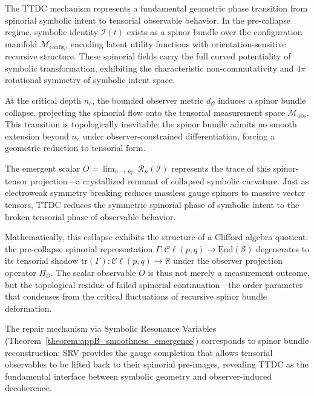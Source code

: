 \begin{scholium}
\label{scholium:bk4_ttdc_symbolic_singularity}
The TTDC mechanism represents a fundamental geometric phase transition from spinorial symbolic intent to tensorial observable behavior. In the pre-collapse regime, symbolic identity $\mathcal{I}(t)$ exists as a spinor bundle over the configuration manifold $\mathcal{M}_{\text{config}}$, encoding latent utility functions with orientation-sensitive recursive structure. These spinorial fields carry the full curved potentiality of symbolic transformation, exhibiting the characteristic non-commutativity and \( 4\pi \) rotational symmetry of symbolic intent space.

At the critical depth $n_c$, the bounded observer metric $d_{\mathcal{O}}$ induces a spinor bundle collapse, projecting the spinorial flow onto the tensorial measurement space $\mathcal{M}_{\text{obs}}$. This transition is topologically inevitable: the spinor bundle admits no smooth extension beyond $n_c$ under observer-constrained differentiation, forcing a geometric reduction to tensorial form.

The emergent scalar $O = \lim_{n \to n_c^-} \mathcal{R}_n(\mathcal{I})$ represents the trace of this spinor-tensor projection—a crystallized remnant of collapsed symbolic curvature. Just as electroweak symmetry breaking reduces massless gauge spinors to massive vector tensors, TTDC reduces the symmetric spinorial phase of symbolic intent to the broken tensorial phase of observable behavior.

Mathematically, this collapse exhibits the structure of a Clifford algebra quotient: the pre-collapse spinorial representation $\Gamma: \mathcal{C}\ell(p,q) \to \text{End}(\mathcal{S})$ degenerates to its tensorial shadow $\text{tr}(\Gamma): \mathcal{C}\ell(p,q) \to \mathbb{R}$ under the observer projection operator $\Pi_{\mathcal{O}}$. The scalar observable $O$ is thus not merely a measurement outcome, but the topological residue of failed spinorial continuation—the order parameter that condenses from the critical fluctuations of recursive spinor bundle deformation.

The repair mechanism via Symbolic Resonance Variables (Theorem~\ref{theorem:appB_smoothness_emergence}) corresponds to spinor bundle reconstruction: SRV provides the gauge completion that allows tensorial observables to be lifted back to their spinorial pre-images, revealing TTDC as the fundamental interface between symbolic geometry and observer-induced decoherence.
\end{scholium}

